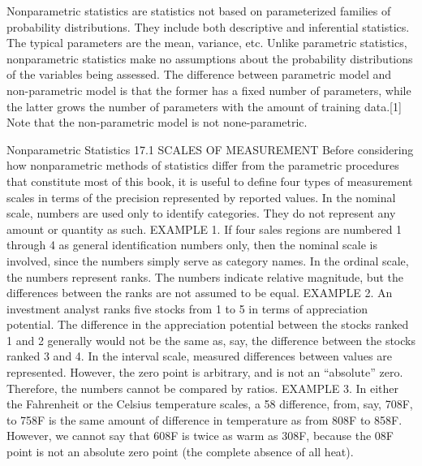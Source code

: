 Nonparametric statistics are statistics not based on parameterized families of probability distributions. They include both descriptive and inferential statistics. The typical parameters are the mean, variance, etc. Unlike parametric statistics, nonparametric statistics make no assumptions about the probability distributions of the variables being assessed. The difference between parametric model and non-parametric model is that the former has a fixed number of parameters, while the latter grows the number of parameters with the amount of training data.[1] Note that the non-parametric model is not none-parametric.



Nonparametric
Statistics
17.1 SCALES OF MEASUREMENT
Before considering how nonparametric methods of statistics differ from the parametric procedures that
constitute most of this book, it is useful to define four types of measurement scales in terms of the precision
represented by reported values.
In the nominal scale, numbers are used only to identify categories. They do not represent any amount or
quantity as such.
EXAMPLE 1. If four sales regions are numbered 1 through 4 as general identification numbers only, then the nominal
scale is involved, since the numbers simply serve as category names.
In the ordinal scale, the numbers represent ranks. The numbers indicate relative magnitude, but the
differences between the ranks are not assumed to be equal.
EXAMPLE 2. An investment analyst ranks five stocks from 1 to 5 in terms of appreciation potential. The difference in the
appreciation potential between the stocks ranked 1 and 2 generally would not be the same as, say, the difference between the
stocks ranked 3 and 4.
In the interval scale, measured differences between values are represented. However, the zero point is
arbitrary, and is not an “absolute” zero. Therefore, the numbers cannot be compared by ratios.
EXAMPLE 3. In either the Fahrenheit or the Celsius temperature scales, a 58 difference, from, say, 708F, to 758F is the
same amount of difference in temperature as from 808F to 858F. However, we cannot say that 608F is twice as warm as 308F,
because the 08F point is not an absolute zero point (the complete absence of all heat).

